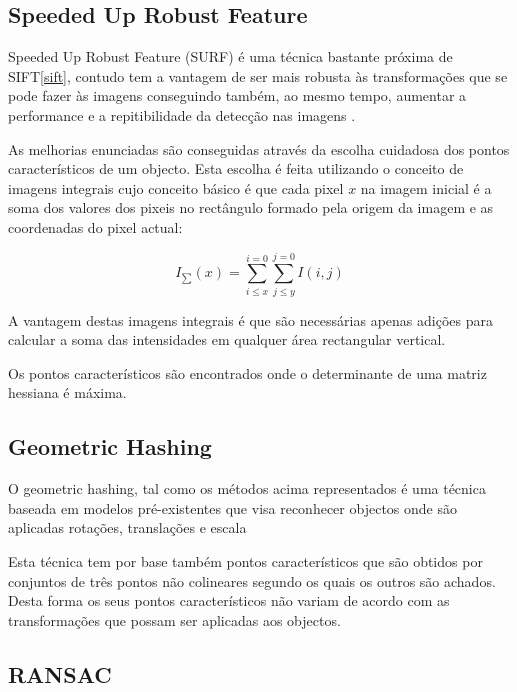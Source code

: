 \subsection[SURF]{Speeded Up Robust Feature}

Speeded Up Robust Feature (SURF) é uma técnica bastante próxima
de SIFT\ref{sift}, contudo tem a vantagem de ser mais robusta às transformações que se pode
fazer às imagens conseguindo também, ao mesmo tempo, aumentar a performance
e a repitibilidade da detecção nas imagens \cite{citeulike:973069}.

As melhorias enunciadas são conseguidas através da escolha cuidadosa
dos pontos característicos de um objecto. Esta escolha é feita
utilizando o conceito de imagens integrais \cite{10.1109CVPR.2001.990517}
cujo conceito básico é que cada pixel $x$ na imagem inicial é a
soma dos valores dos pixeis no rectângulo formado pela origem da
imagem e as coordenadas do pixel actual:

\[
I_\sum(x) = \sum_{i \leq x}^{i=0} \sum_{j \leq y}^{j=0} I(i,j)
\]


A vantagem destas imagens integrais é que são necessárias apenas adições
para calcular a soma das intensidades em qualquer área rectangular vertical.

Os pontos característicos são encontrados onde o determinante de uma matriz
hessiana é máxima.


\subsection{Geometric Hashing}

O geometric hashing, tal como os métodos acima representados é uma técnica baseada
em modelos pré-existentes que visa reconhecer objectos onde são aplicadas rotações,
translações e escala \cite{1989SPIE.1095..515C}

Esta técnica tem por base também pontos característicos que são obtidos por
conjuntos de três pontos não colineares segundo os quais os outros são achados. 
Desta forma os seus pontos característicos não variam de acordo com as 
transformações que possam ser aplicadas aos objectos.



\subsection{RANSAC}

